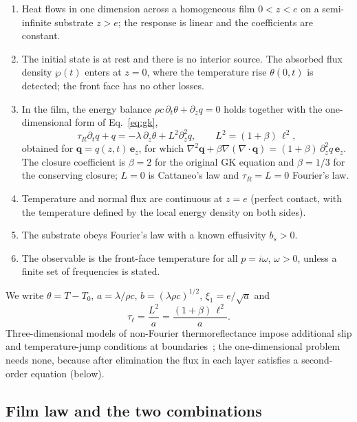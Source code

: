 \begin{enumerate}
\item[(F1)] Heat flows in one dimension across a homogeneous film $0<z<e$ on a semi-infinite substrate
$z>e$; the response is linear and the coefficients are constant.
\item[(F2)] The initial state is at rest and there is no interior source. The absorbed flux density
$\wp(t)$ enters at $z=0$, where the temperature rise $\theta(0,t)$ is detected; the front face has no
other losses.
\item[(F3)] In the film, the energy balance $\rho c\,\partial_t\theta+\partial_zq=0$ holds together with the
one-dimensional form of Eq.~\eqref{eq:gk},
\begin{equation}
\tau_R\partial_tq+q=-\lambda\,\partial_z\theta+L^2\partial_z^2q,\qquad L^2=(1+\beta)\,\ell^2 ,
\label{eq:gk1d}
\end{equation}
obtained for $\mathbf q=q(z,t)\,\mathbf e_z$, for which
$\nabla^2\mathbf q+\beta\nabla(\nabla\cdot\mathbf q)=(1+\beta)\,\partial_z^2q\,\mathbf e_z$. The closure
coefficient is $\beta=2$ for the original GK equation and $\beta=1/3$ for the conserving closure;
$L=0$ is Cattaneo's law and $\tau_R=L=0$ Fourier's law.
\item[(F4)] Temperature and normal flux are continuous at $z=e$ (perfect contact, with the
temperature defined by the local energy density on both sides).
\item[(F5)] The substrate obeys Fourier's law with a known effusivity $b_s>0$.
\item[(F6)] The observable is the front-face temperature for all $p=i\omega$, $\omega>0$, unless a finite
set of frequencies is stated.
\end{enumerate}
We write $\theta=T-T_0$, $a=\lambda/\rho c$, $b=(\lambda\rho c)^{1/2}$, $\xi_1=e/\sqrt a$ and
\begin{equation}
\tau_\ell=\frac{L^2}{a}=\frac{(1+\beta)\,\ell^2}{a}.
\label{eq:taul}
\end{equation}
Three-dimensional models of non-Fourier thermoreflectance impose additional slip and temperature-jump
conditions at boundaries~\cite{Beardo2020,HennessyMyers2021}; the one-dimensional problem needs none,
because after elimination the flux in each layer satisfies a second-order equation (below).

\subsection{Film law and the two combinations}\label{sec:combinations}

